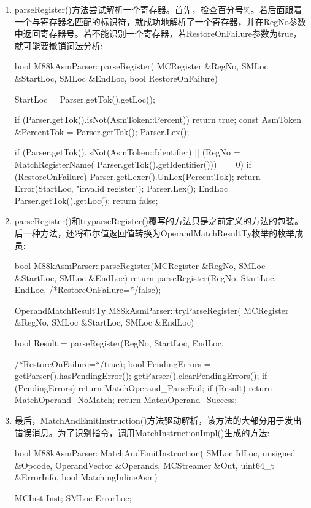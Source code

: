 \begin{enumerate}
\item
parseRegister()方法尝试解析一个寄存器。首先，检查百分号\%。若后面跟着一个与寄存器名匹配的标识符，就成功地解析了一个寄存器，并在RegNo参数中返回寄存器号。若不能识别一个寄存器，若RestoreOnFailure参数为true，就可能要撤销词法分析:

\begin{cpp}
bool M88kAsmParser::parseRegister(
        MCRegister &RegNo, SMLoc &StartLoc, SMLoc &EndLoc,
        bool RestoreOnFailure) {
    StartLoc = Parser.getTok().getLoc();

    if (Parser.getTok().isNot(AsmToken::Percent))
        return true;
    const AsmToken &PercentTok = Parser.getTok();
    Parser.Lex();

    if (Parser.getTok().isNot(AsmToken::Identifier) ||
        (RegNo = MatchRegisterName(
            Parser.getTok().getIdentifier())) == 0) {
        if (RestoreOnFailure)
            Parser.getLexer().UnLex(PercentTok);
        return Error(StartLoc, "invalid register");
    }
    Parser.Lex();
    EndLoc = Parser.getTok().getLoc();
    return false;
}
\end{cpp}

\item
parseRegister()和tryparseRegister()覆写的方法只是之前定义的方法的包装。后一种方法，还将布尔值返回值转换为OperandMatchResultTy枚举的枚举成员:

\begin{cpp}
bool M88kAsmParser::parseRegister(MCRegister &RegNo,
                                    SMLoc &StartLoc,
                                    SMLoc &EndLoc) {
    return parseRegister(RegNo, StartLoc, EndLoc,
                         /*RestoreOnFailure=*/false);
}

OperandMatchResultTy M88kAsmParser::tryParseRegister(
        MCRegister &RegNo, SMLoc &StartLoc, SMLoc &EndLoc) {
    bool Result =
        parseRegister(RegNo, StartLoc, EndLoc,

    /*RestoreOnFailure=*/true);
    bool PendingErrors = getParser().hasPendingError();
    getParser().clearPendingErrors();
    if (PendingErrors)
        return MatchOperand_ParseFail;
    if (Result)
        return MatchOperand_NoMatch;
    return MatchOperand_Success;
}
\end{cpp}

\item
最后，MatchAndEmitInstruction()方法驱动解析，该方法的大部分用于发出错误消息。为了识别指令，调用MatchInstructionImpl()生成的方法:

\begin{cpp}
bool M88kAsmParser::MatchAndEmitInstruction(
        SMLoc IdLoc, unsigned &Opcode,
        OperandVector &Operands, MCStreamer &Out,
        uint64_t &ErrorInfo, bool MatchingInlineAsm) {
    MCInst Inst;
    SMLoc ErrorLoc;

}
\end{cpp}
\end{enumerate}
